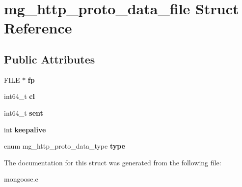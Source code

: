 \hypertarget{structmg__http__proto__data__file}{}\section{mg\+\_\+http\+\_\+proto\+\_\+data\+\_\+file Struct Reference}
\label{structmg__http__proto__data__file}
\subsection*{Public Attributes}
\begin{DoxyCompactItemize}
\item 
\mbox{\label{structmg__http__proto__data__file_a3c2842046c2608a6c0c3019516b6f5a4}} 
F\+I\+LE $\ast$ {\bfseries fp}
\item 
\mbox{\label{structmg__http__proto__data__file_a68d6d737e984334010c34a2ec49786c2}} 
int64\+\_\+t {\bfseries cl}
\item 
\mbox{\label{structmg__http__proto__data__file_a7e291f2aa92c71cde4120c3e08fc5705}} 
int64\+\_\+t {\bfseries sent}
\item 
\mbox{\label{structmg__http__proto__data__file_a16b68614dc21d136126ec9a6b7524dee}} 
int {\bfseries keepalive}
\item 
\mbox{\label{structmg__http__proto__data__file_a85da9b61dc998cbf4be7e276fb96d164}} 
enum mg\+\_\+http\+\_\+proto\+\_\+data\+\_\+type {\bfseries type}
\end{DoxyCompactItemize}


The documentation for this struct was generated from the following file\+:\begin{DoxyCompactItemize}
\item 
mongoose.\+c\end{DoxyCompactItemize}
